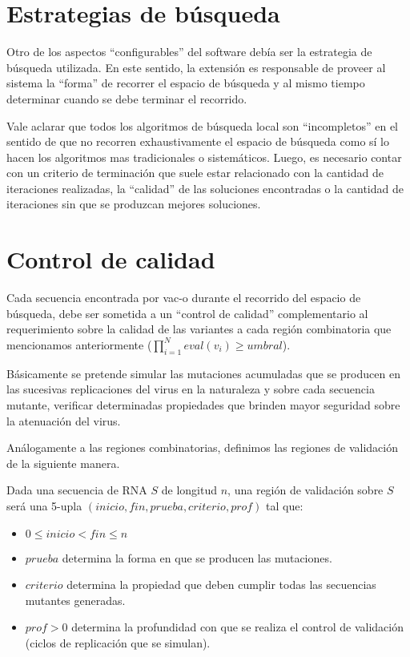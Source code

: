 \section{Estrategias de b\'usqueda}

Otro de los aspectos ``configurables'' del software deb\'ia ser la estrategia
de b\'usqueda utilizada. En este sentido, la extensi\'on es responsable de
proveer al sistema la ``forma'' de recorrer el espacio de b\'usqueda y al mismo
tiempo determinar cuando se debe terminar el recorrido.

Vale aclarar que todos los algoritmos de b\'usqueda local son ``incompletos''
en el sentido de que no recorren exhaustivamente el espacio de b\'usqueda como
s\'i lo hacen los algoritmos mas tradicionales o sistem\'aticos. Luego, es
necesario contar con un criterio de terminaci\'on que suele estar relacionado
con la cantidad de iteraciones realizadas, la ``calidad'' de las soluciones
encontradas o la cantidad de iteraciones sin que se produzcan mejores
soluciones.

\section{Control de calidad}

Cada secuencia encontrada por \ac{vac-o} durante el recorrido del espacio
de b\'usqueda, debe ser sometida a un ``control de calidad'' complementario al
requerimiento sobre la calidad de las variantes a cada regi\'on combinatoria
que mencionamos anteriormente ($\prod_{i=1}^{N} eval(v_{i}) \ge umbral$).

B\'asicamente se pretende simular las mutaciones acumuladas que se producen en
las sucesivas replicaciones del virus en la naturaleza y sobre cada secuencia
mutante, verificar determinadas propiedades que brinden mayor seguridad sobre la
atenuaci\'on del virus.

An\'alogamente a las regiones combinatorias, definimos las regiones de
validaci\'on de la siguiente manera.

\begin{definition}
Dada una secuencia de \ac{RNA} $S$ de longitud $n$, una regi\'on de validaci\'on
sobre $S$ ser\'a una 5-upla $(inicio, fin, prueba, criterio, prof)$ tal que:
\begin{itemize}
 \item $0 \le inicio < fin \le n$
 \item $prueba$ determina la forma en que se producen las mutaciones.
 \item $criterio$ determina la propiedad que deben cumplir todas las secuencias
mutantes generadas.
 \item $prof>0$ determina la profundidad con que se realiza el control de
validaci\'on (ciclos de replicaci\'on que se simulan).
\end{itemize}
\end{definition}

